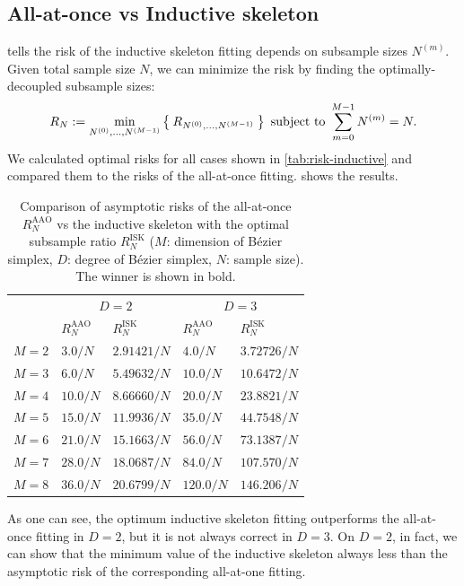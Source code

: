 \documentclass{article}
\begin{document}
\subsection{All-at-once vs Inductive skeleton}\label{sec:all-vs-inductive}
 tells the risk of the inductive skeleton fitting depends on subsample sizes $N^{(m)}$.
Given total sample size $N$, we can minimize the risk by finding the optimally-decoupled subsample sizes:
\begin{align}
    R_N := \min_{N^{(0)}, \dots, N^{(M-1)}} \Set{R_{N^{(0)}, \dots, N^{(M-1)}}} \text{ subject to } \sum_{m=0}^{M-1} N^{(m)} = N.
\end{align}
We calculated optimal risks for all cases shown in \cref{tab:risk-inductive} and compared them to the risks of the all-at-once fitting.
 shows the results.
\begin{table}[H]
\centering
\caption{Comparison of asymptotic risks of the all-at-once $R_N^\mathrm{AAO}$ vs the inductive skeleton with the optimal subsample ratio $R_N^\mathrm{ISK}$ ($M$: dimension of B\'ezier simplex, $D$: degree of B\'ezier simplex, $N$: sample size). The winner is shown in bold.}\label{tab:risk-comparison}
\begin{tabular}{l|ll|ll} \toprule
& \multicolumn{2}{c|}{$D = 2$} & \multicolumn{2}{c}{$D = 3$} \\ 
& $R_{N}^\mathrm{AAO}$ & $R_N^\mathrm{ISK}$
& $R_{N}^\mathrm{AAO}$ & $R_N^\mathrm{ISK}$
\\ \midrule
$M = 2$ &
$3.0 / N$ &
$\bm{2.91421} / N$ &
$4.0 / N$ &
$\bm{3.72726} / N$
\\
$M = 3$ &
$6.0 / N$ &
$\bm{5.49632} / N$ &
$\bm{10.0} / N$ &
$10.6472 / N$
\\
$M = 4$ &
$10.0 / N$ &
$\bm{8.66660} / N$ &
$\bm{20.0} / N$ &
$23.8821 / N$
\\
$M = 5$ &
$15.0 / N$ &
$\bm{11.9936} / N$ &
$\bm{35.0} / N$ &
$44.7548 / N$
\\
$M = 6$ &
$21.0 / N$ &
$\bm{15.1663} / N$ &
$\bm{56.0} / N$ &
$73.1387 / N$
\\
$M = 7$ &
$28.0 / N$ &
$\bm{18.0687} / N$ &
$\bm{84.0} / N$ &
$107.570 / N$
\\
$M = 8$ &
$36.0 / N$ &
$\bm{20.6799} / N$ &
$\bm{120.0} / N$ &
$146.206 / N$
\\ \bottomrule
\end{tabular}
\end{table}

As one can see, the optimum inductive skeleton fitting outperforms the all-at-once fitting in $D = 2$, but it is not always correct in $D = 3$.
On $D = 2$, in fact, we can show that the minimum value of the inductive skeleton always less than the asymptotic risk of the corresponding all-at-one fitting.
\end{document}

